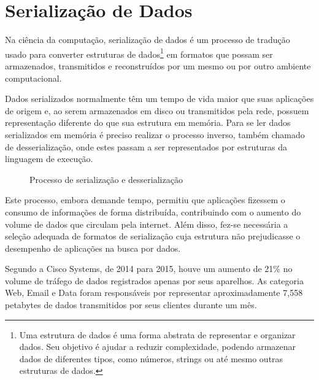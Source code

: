 \section[Serialização de Dados]{Serialização de Dados}

Na ciência da computação, serialização de dados é um processo de tradução usado para converter estruturas de dados\footnote{
  Uma estrutura de dados é uma forma abstrata de representar e organizar dados. Seu objetivo é ajudar a reduzir complexidade, podendo armazenar dados de diferentes tipos, como números, strings ou até mesmo outras estruturas de dados.
} em formatos que possam ser armazenados, transmitidos e reconstruídos por um mesmo ou por outro ambiente computacional. \cite{Cline2016}

Dados serializados normalmente têm um tempo de vida maior que suas aplicações de origem e, ao serem armazenados em disco ou transmitidos pela rede, possuem representação diferente do que sua estrutura em memória. Para se ler dados serializados em memória é preciso realizar o processo inverso, também chamado de desserialização, onde estes passam a ser representados por estruturas da linguagem de execução. \cite{Guller2016}

\begin{figure}[H]
  \centering
  \caption{Processo de serialização e desserialização}
\end{figure}

Este processo, embora demande tempo, permitiu que aplicações fizessem o consumo de informações de forma distribuída, contribuindo com o aumento do volume de dados que circulam pela internet. Além disso, fez-se necessária a seleção adequada de formatos de serialização cuja estrutura não prejudicasse o desempenho de aplicações na busca por dados. \cite{SumarayMakki2012}

Segundo a Cisco Systems, de 2014 para 2015, houve um aumento de 21\% no volume de tráfego de dados registrados apenas por seus aparelhos. As categoria Web, Email e Data foram responsáveis por representar aproximadamente 7,558 petabytes de dados transmitidos por seus clientes durante um mês. \cite{Cisco2016}

